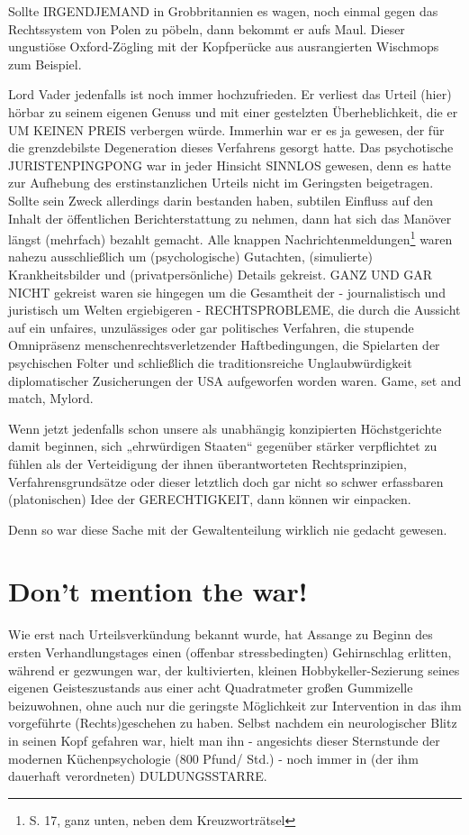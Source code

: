 \begin{multicols}{2}
Sollte IRGENDJEMAND in Grobbritannien es wagen,
noch einmal gegen das Rechtssystem von Polen zu pöbeln, dann bekommt er aufs Maul. Dieser ungustiöse
Oxford-Zögling mit der Kopfperücke aus ausrangierten
Wischmops zum Beispiel.

Lord Vader jedenfalls ist noch immer hochzufrieden. Er
verliest das Urteil (hier) hörbar zu seinem eigenen Genuss und mit einer gestelzten Überheblichkeit, die er
UM KEINEN PREIS verbergen würde. Immerhin war er
es ja gewesen, der für die grenzdebilste Degeneration
dieses Verfahrens gesorgt hatte. Das psychotische JURISTENPINGPONG war in jeder Hinsicht SINNLOS gewesen, denn es hatte zur Aufhebung des erstinstanzlichen Urteils nicht im Geringsten beigetragen. Sollte sein
Zweck allerdings darin bestanden haben, subtilen Einfluss auf den Inhalt der öffentlichen Berichterstattung
zu nehmen, dann hat sich das Manöver längst (mehrfach) bezahlt gemacht. Alle knappen Nachrichtenmeldungen\footnote[34]{S. 17, ganz unten, neben dem Kreuzworträtsel} waren nahezu ausschließlich um (psychologische) Gutachten, (simulierte) Krankheitsbilder und
(privatpersönliche) Details gekreist. GANZ UND GAR
NICHT gekreist waren sie hingegen um die Gesamtheit
der - journalistisch und juristisch um Welten ergiebigeren - RECHTSPROBLEME, die durch die Aussicht auf ein
unfaires, unzulässiges oder gar politisches Verfahren, die
stupende Omnipräsenz menschenrechtsverletzender
Haftbedingungen, die Spielarten der psychischen Folter
und schließlich die traditionsreiche Unglaubwürdigkeit
diplomatischer Zusicherungen der USA aufgeworfen
worden waren. Game, set and match, Mylord.

Wenn jetzt jedenfalls schon unsere als unabhängig konzipierten Höchstgerichte damit beginnen, sich „ehrwürdigen Staaten“ gegenüber stärker verpflichtet zu fühlen
als der Verteidigung der ihnen überantworteten Rechtsprinzipien, Verfahrensgrundsätze oder dieser letztlich
doch gar nicht so schwer erfassbaren (platonischen)
Idee der GERECHTIGKEIT, dann können wir einpacken.

Denn so war diese Sache mit der Gewaltenteilung wirklich nie gedacht gewesen.


\section{Don’t mention the war!} %
Wie erst nach Urteilsverkündung bekannt wurde, hat Assange zu Beginn des ersten Verhandlungstages einen (offenbar stressbedingten) Gehirnschlag erlitten, während
er gezwungen war, der kultivierten, kleinen Hobbykeller-Sezierung seines eigenen Geisteszustands aus einer
acht Quadratmeter großen Gummizelle beizuwohnen,
ohne auch nur die geringste Möglichkeit zur Intervention in das ihm vorgeführte (Rechts)geschehen zu haben.
Selbst nachdem ein neurologischer Blitz in seinen Kopf
gefahren war, hielt man ihn - angesichts dieser Sternstunde der modernen Küchenpsychologie (800 Pfund/
Std.) - noch immer in (der ihm dauerhaft verordneten)
DULDUNGSSTARRE.


\end{multicols}
